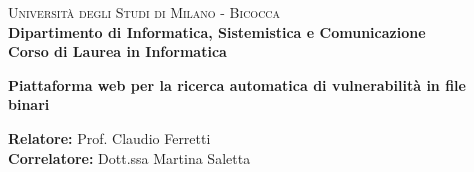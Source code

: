 

    
\begin{titlepage}
    
    \noindent
    \begin{minipage}[t]{0.19\textwidth}
    \end{minipage}
    \hspace{2mm}
    \begin{minipage}[t]{0.70\textwidth}
    {
            {\textsc{Università degli Studi di Milano - Bicocca}} \\
            \textbf{Dipartimento di Informatica, Sistemistica e Comunicazione} \\
            \textbf{Corso di Laurea in Informatica} \\
            \par
    }
    \end{minipage}
    
\vspace{40mm}
    
\begin{center}
        {\LARGE{
                \textbf{ Piattaforma web per la ricerca automatica di vulnerabilità in file binari } }
                \par
        }
    \end{center}
    
    \vspace{50mm}

    \noindent
    {\large \textbf{Relatore:} Prof. Claudio Ferretti } \\

    \noindent
    {\large \textbf{Correlatore:} Dott.ssa Martina Saletta }
    
    \vspace{15mm}


\end{titlepage}
